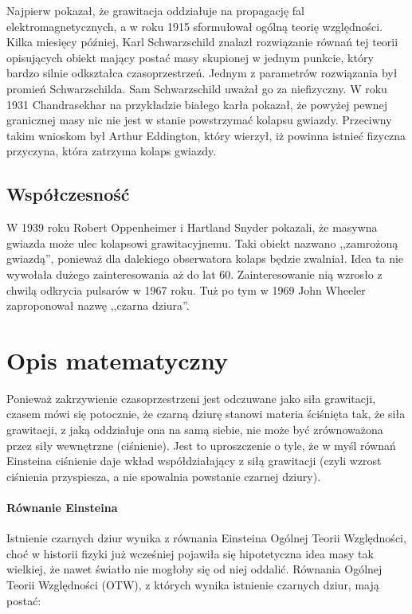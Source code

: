 \documentclass[12pt]{article}
\begin{document}
Najpierw pokaza\l{}, \.{z}e grawitacja oddzia\l{}uje na propagacj\k{e} fal \newline elektromagnetycznych, a w roku 1915 sformu\l{}owa\l{} og\'{o}ln\k{a} teori\k{e} wzgl\k{e}dno\'{s}ci. Kilka miesi\k{e}cy p\'{o}\'{z}niej, Karl Schwarzschild znalaz\l{} rozwi\k{a}zanie r\'{o}wna\'{n} tej teorii opisuj\k{a}cych obiekt maj\k{a}cy posta\'{c} masy skupionej w jednym punkcie, kt\'{o}ry bardzo silnie odkszta\l{}ca czasoprzestrze\'{n}. Jednym z parametr\'{o}w \newline rozwi\k{a}zania by\l{} promie\'{n} Schwarzschilda. Sam Schwarzschild uwa\.{z}a\l{} go za niefizyczny. W roku 1931 Chandrasekhar na przyk\l{}adzie bia\l{}ego kar\l{}a pokaza\l{}, \.{z}e powy\.{z}ej pewnej granicznej masy nic nie jest w stanie powstrzyma\'{c} kolapsu gwiazdy. Przeciwny takim wnioskom by\l{} Arthur Eddington, kt\'{o}ry wierzy\l{}, i\.{z} powinna istnie\'{c} fizyczna przyczyna, kt\'{o}ra zatrzyma kolaps gwiazdy.
\subsection{Wsp\'{o}\l{}czesno\'{s}\'{c}}
W 1939 roku Robert Oppenheimer i Hartland Snyder pokazali, \.{z}e masywna gwiazda mo\.{z}e ulec kolapsowi grawitacyjnemu. Taki obiekt nazwano ,,zamro\.{z}on\k{a} gwiazd\k{a}\textquotedblright{}, poniewa\.{z} dla dalekiego obserwatora kolaps b\k{e}dzie zwalnia\l{}. Idea ta nie wywo\l{}a\l{}a du\.{z}ego zainteresowania a\.{z} do lat 60. Zainteresowanie ni\k{a} wzros\l{}o z chwil\k{a} odkrycia pulsar\'{o}w w 1967 roku. Tu\.{z} po tym w 1969 John Wheeler zaproponowa\l{} nazw\k{e} ,,czarna dziura\textquotedblright{}.
\newpage
\section{Opis matematyczny}
Poniewa\.{z} zakrzywienie czasoprzestrzeni jest odczuwane jako si\l{}a grawitacji, czasem m\'{o}wi si\k{e} potocznie, \.{z}e czarn\k{a} dziur\k{e} stanowi materia \'{s}ci\'{s}ni\k{e}ta tak, \.{z}e si\l{}a grawitacji, z jak\k{a} oddzia\l{}uje ona na sam\k{a} siebie, nie mo\.{z}e by\'{c} zr\'{o}wnowa\.{z}ona przez si\l{}y wewn\k{e}trzne (ci\'{s}nienie). Jest to uproszczenie o tyle, \.{z}e w my\'{s}l r\'{o}wna\'{n} Einsteina ci\'{s}nienie daje wk\l{}ad wsp\'{o}\l{}dzia\l{}aj\k{a}cy z si\l{}\k{a} grawitacji (czyli wzrost ci\'{s}nienia przyspiesza, a nie spowalnia powstanie czarnej dziury).
\paragraph{R\'{o}wnanie Einsteina}
Istnienie czarnych dziur wynika z r\'{o}wnania Einsteina Og\'{o}lnej Teorii Wzgl\k{e}dno\'{s}ci, cho\'{c} w historii fizyki ju\.{z} wcze\'{s}niej pojawi\l{}a si\k{e} hipotetyczna idea masy tak wielkiej, \.{z}e nawet \'{s}wiat\l{}o nie mog\l{}oby si\k{e} od niej oddali\'{c}. R\'{o}wnania Og\'{o}lnej Teorii Wzgl\k{e}dno\'{s}ci (OTW), z kt\'{o}rych wynika istnienie czarnych dziur, maj\k{a} posta\'{c}:
\end{document}
